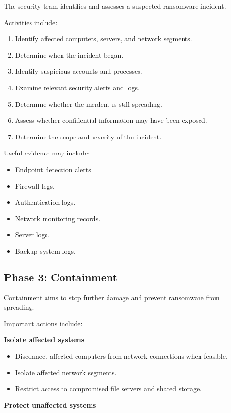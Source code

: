 The security team identifies and assesses a suspected ransomware incident.

Activities include:

\begin{enumerate}
\item Identify affected computers, servers, and network segments.
\item Determine when the incident began.
\item Identify suspicious accounts and processes.
\item Examine relevant security alerts and logs.
\item Determine whether the incident is still spreading.
\item Assess whether confidential information may have been exposed.
\item Determine the scope and severity of the incident.
\end{enumerate}

Useful evidence may include:

\begin{itemize}
\item Endpoint detection alerts.
\item Firewall logs.
\item Authentication logs.
\item Network monitoring records.
\item Server logs.
\item Backup system logs.
\end{itemize}

\subsection{Phase 3: Containment}

Containment aims to stop further damage and prevent ransomware from spreading.

Important actions include:

\textbf{Isolate affected systems}

\begin{itemize}
\item Disconnect affected computers from network connections when feasible.
\item Isolate affected network segments.
\item Restrict access to compromised file servers and shared storage.
\end{itemize}

\textbf{Protect unaffected systems}

